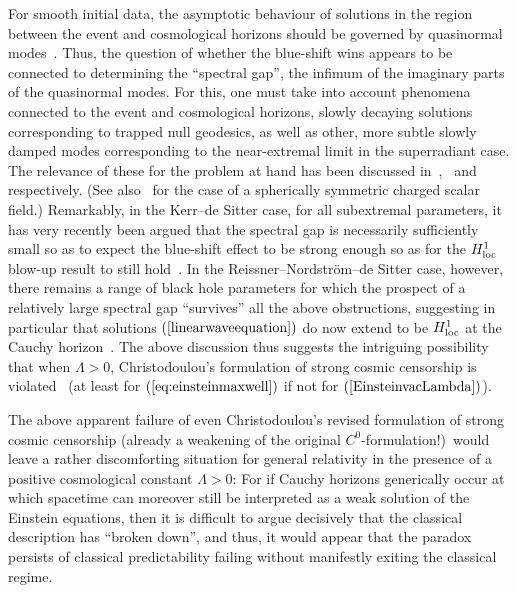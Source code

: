 \documentclass[A4,10pt]{article}
\begin{document}
For smooth initial data, the asymptotic behaviour of solutions in the
region between the event and cosmological horizons should be governed
by quasinormal modes~\cite{Chandrasekhar, dyatlov2011quasi,warnick}. Thus, the question of whether the blue-shift wins
appears to be connected to determining the ``spectral gap'',
the infimum of the imaginary parts of the quasinormal modes. 
For this, one must take into account phenomena connected to 
the event and cosmological horizons, 
slowly decaying solutions corresponding to trapped null geodesics,
as well as other, more subtle slowly damped modes corresponding to the near-extremal limit in
the superradiant case. The relevance of these for the problem at hand has been 
discussed in~\cite{bradymossmyers},~\cite{cardosoetal} and~\cite{Dias:2018ynt} 
respectively. (See also~\cite{hodhod} for the case of a spherically symmetric charged scalar field.) Remarkably, in the Kerr--de Sitter  case,  
 for all subextremal 
parameters,
it has very recently been argued that the spectral
gap is necessarily sufficiently small so as to expect the blue-shift effect to be
strong enough so as for 
the $H^1_{\rm loc}$ blow-up result to still hold~\cite{Dias:2018ynt}.
In the Reissner--Nordstr\"om--de Sitter case, however, there remains a range of black hole 
parameters for which the prospect of a relatively large
 spectral gap ``survives'' all the above obstructions, suggesting in particular
 that solutions $(\ref{linearwaveequation})$ do now extend to be $H^1_{\rm loc}$ at the
Cauchy horizon~\cite{cardosoetal, Dias:2018ynt}.
The above discussion thus  suggests the intriguing possibility that when
$\Lambda>0$, Christodoulou's formulation
of strong cosmic censorship is violated~\cite{Dafermos2014, HarveyPhy,cardosoetal} (at least
 for $(\ref{eq:einsteinmaxwell})$
if not for  $(\ref{EinsteinvacLambda})$).


The above apparent failure of even Christodoulou's revised formulation of strong cosmic censorship (already a weakening of the original $C^0$-formulation!)~would leave
a rather discomforting situation for general relativity in the presence of a positive
cosmological constant $\Lambda>0$: 
For if Cauchy horizons generically occur at which
spacetime can moreover still be interpreted as a weak solution of
the Einstein equations, then it is difficult to argue decisively that the classical description has
``broken down'', and thus, it would appear that the paradox  persists 
of classical predictability failing without manifestly exiting the classical regime.
\end{document}
